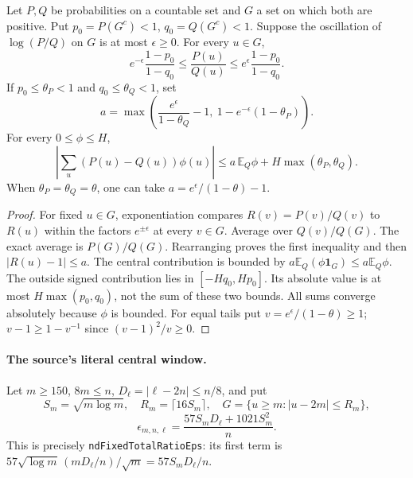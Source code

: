\begin{lemma}
\label{lem:Mazur-exact-likelihood}
Let $P,Q$ be probabilities on a countable set and $G$ a set on which
both are positive. Put $p_0=P(G^c)<1$, $q_0=Q(G^c)<1$.
Suppose the oscillation of $\log(P/Q)$ on $G$ is at most $\epsilon\ge0$.
For every $u\in G$,
\begin{equation}
 e^{-\epsilon}\frac{1-p_0}{1-q_0}
 \le \frac{P(u)}{Q(u)}
 \le e^\epsilon\frac{1-p_0}{1-q_0}.
 \label{eq:Mazur-exact-likelihood}
\end{equation}
If $p_0\le\theta_P<1$ and $q_0\le\theta_Q<1$, set
\[
 a=\max\left(\frac{e^\epsilon}{1-\theta_Q}-1,\
              1-e^{-\epsilon}(1-\theta_P)\right).
\]
For every $0\le\phi\le H$,
\begin{equation}
 \left|\sum_u(P(u)-Q(u))\phi(u)\right|
 \le a\,\mathbb E_Q\phi+H\max(\theta_P,\theta_Q).
 \label{eq:Mazur-signed-tail}
\end{equation}
When $\theta_P=\theta_Q=\theta$, one can take
$a=e^\epsilon/(1-\theta)-1$.
\end{lemma}
\begin{proof}
For fixed $u\in G$, exponentiation compares $R(v)=P(v)/Q(v)$
to $R(u)$ within the factors $e^{\pm\epsilon}$ at every $v\in G$.
Average over $Q(v)/Q(G)$. The exact average is $P(G)/Q(G)$.
Rearranging proves the first inequality and then $|R(u)-1|\le a$.
The central contribution is bounded by
$a\mathbb E_Q(\phi\mathbf1_G)\le a\mathbb E_Q\phi$.
The outside signed contribution lies in $[-Hq_0,Hp_0]$.
Its absolute value is at most $H\max(p_0,q_0)$, not the sum
of these two bounds. All sums converge absolutely because $\phi$
is bounded. For equal tails put $v=e^\epsilon/(1-\theta)\ge1$;
$v-1\ge1-v^{-1}$ since $(v-1)^2/v\ge0$.
\end{proof}

\paragraph{The source's literal central window.}
Let $m\ge150$, $8m\le n$, $D_\ell=|\ell-2n|\le n/8$, and put
\[
 S_m=\sqrt{m\log m},\quad R_m=\lceil16S_m\rceil,\quad
 G=\{u\ge m:|u-2m|\le R_m\},
\]
\[
 \epsilon_{m,n,\ell}=\frac{57S_mD_\ell+1021S_m^2}{n}.
\]
This is precisely \texttt{ndFixedTotalRatioEps}: its first term is
$57\sqrt{\log m}\,(mD_\ell/n)/\sqrt m=57S_mD_\ell/n$.

